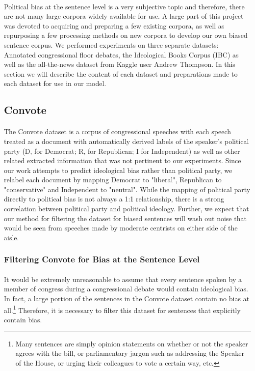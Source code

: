 \documentclass[10pt,a4paper,onecolumn]{article}
\begin{document}
\paragraph{}
Political bias at the sentence level is a very subjective topic and therefore, there are not many large corpora widely available for use. A large part of this project was devoted to acquiring and preparing a few existing corpora, as well as repurposing a few processing methods on new corpora to develop our own biased sentence corpus. We performed experiments on three separate datasets: Annotated congressional floor debates\cite{convote}, the Ideological Books Corpus (IBC)\cite{iyyerRNN} as well as the all-the-news dataset from Kaggle user Andrew Thompson. In this section we will describe the content of each dataset and preparations made to each dataset for use in our model.


\subsection{Convote}
\paragraph{}
The Convote dataset is a corpus of congressional speeches with each speech treated as a document with automatically derived labels of the speaker's political party (D, for Democrat; R, for Republican; I for Independent) as well as other related extracted information that was not pertinent to our experiments. Since our work attempts to predict ideological bias rather than political party, we relabel each document by mapping Democrat to "liberal", Republican to "conservative" and Independent to "neutral". While the mapping of political party directly to political bias is not always a 1:1 relationship, there is a strong correlation between political party and political ideology. Further, we expect that our method for filtering the dataset for biased sentences will wash out noise that would be seen from speeches made by moderate centrists on either side of the aisle.

\subsubsection{Filtering Convote for Bias at the Sentence Level}
\label{sec:filtering}
\paragraph{}
It would be extremely unreasonable to assume that every sentence spoken by a member of congress during a congressional debate would contain ideological bias. In fact, a large portion of the sentences in the Convote dataset contain no bias at all.\footnote{Many sentences are simply opinion statements on whether or not the speaker agrees with the bill, or parliamentary jargon such as addressing the Speaker of the House, or urging their colleagues to vote a certain way, etc.} Therefore, it is necessary to filter this dataset for sentences that explicitly contain bias. 
\end{document}
